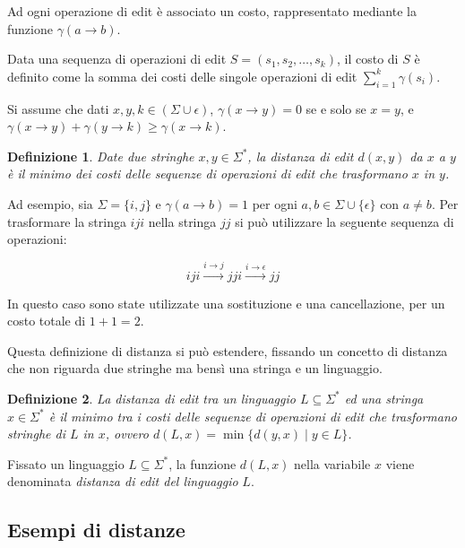 \documentclass[a4paper,12pt]{report}
\newtheorem{definition}{Definizione}[chapter]
\theoremstyle{propositionstyle}
\begin{document}
    Ad ogni operazione di edit è associato un costo, rappresentato mediante la funzione $\gamma(a \rightarrow b)$.
    
    Data una sequenza di operazioni di edit $S = (s_1, s_2, \dots, s_k)$, il costo di $S$ è definito come la somma dei costi delle singole operazioni di edit
    $\sum_{i=1}^{k} \gamma(s_i)$.

    Si assume che dati $x, y, k \in (\Sigma \cup \epsilon)$, $\gamma(x \rightarrow y) = 0$ se e solo se $x = y$, e $\gamma(x \rightarrow y)
    + \gamma(y \rightarrow k) \geq \gamma(x \rightarrow k)$.

    \begin{definition}
        Date due stringhe $x, y \in \Sigma^*$, la distanza di edit $d(x, y)$ da $x$ a $y$ è il minimo dei costi delle sequenze di operazioni di edit che trasformano $x$ in $y$.
    \end{definition}
    
    Ad esempio, sia $\Sigma = \{i, j\}$ e $\gamma(a \rightarrow b) = 1$ per ogni $a, b \in \Sigma \cup \{\epsilon\}$ con $a \neq b$. Per trasformare la stringa $iji$ nella stringa $jj$ si può utilizzare la seguente sequenza di operazioni:
    
    $$iji \xrightarrow{i \rightarrow j} jji \xrightarrow{i \rightarrow \epsilon} jj$$
    
    In questo caso sono state utilizzate una sostituzione e una cancellazione, per un costo totale di $1 + 1 = 2$.

    Questa definizione di distanza si può estendere, fissando un concetto di distanza che non riguarda due stringhe ma bensì una stringa e un linguaggio.

    \begin{definition}
        La distanza di edit tra un linguaggio $L \subseteq \Sigma^*$ ed una stringa $x \in \Sigma^*$ è il minimo tra i costi delle sequenze di operazioni di edit
        che trasformano stringhe di $L$ in $x$, ovvero $d(L, x) = \min\{d(y, x) \mid y \in L \}$.
    \end{definition}

    Fissato un linguaggio $L \subseteq \Sigma^*$, la funzione $d(L, x)$ nella variabile $x$ viene denominata \textit{distanza di edit del linguaggio} $L$.

    \subsection{Esempi di distanze}
    
\end{document}
